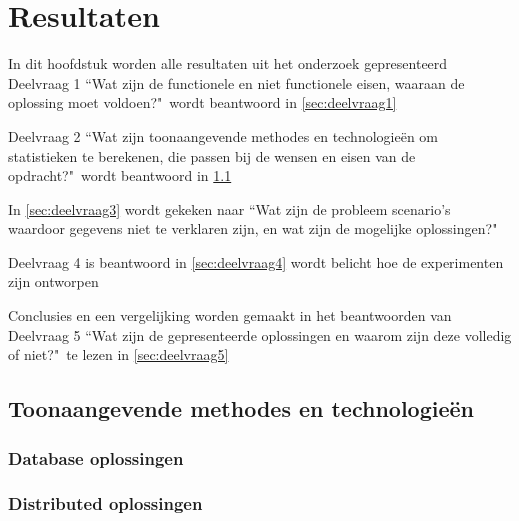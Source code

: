 \chapter{Resultaten}

In dit hoofdstuk worden alle resultaten uit het onderzoek gepresenteerd
Deelvraag 1 ``Wat zijn de functionele en niet functionele eisen, waaraan de oplossing moet voldoen?"\ wordt beantwoord in \ref{sec:deelvraag1}

Deelvraag 2 ``Wat zijn toonaangevende methodes en technologieën om statistieken te berekenen, die passen bij de wensen en eisen van de opdracht?"\  wordt beantwoord in \ref{sec:deelvraag2}

In \ref{sec:deelvraag3} wordt gekeken naar ``Wat zijn de probleem scenario's waardoor gegevens niet te verklaren zijn, en wat zijn de mogelijke oplossingen?"\

Deelvraag 4 is beantwoord in \ref{sec:deelvraag4} wordt belicht hoe de experimenten zijn ontworpen

Conclusies en een vergelijking worden gemaakt in het beantwoorden van Deelvraag 5 ``Wat zijn de gepresenteerde oplossingen en waarom zijn deze volledig of niet?"\ te lezen in \ref{sec:deelvraag5}


\clearpage



\clearpage

\section{Toonaangevende methodes en technologieën}
\label{sec:deelvraag2}


\newpage

\subsection{Database oplossingen}
\label{sec:databases}

\clearpage

\subsection{Distributed oplossingen}
\label{sec:distributed}

\clearpage

